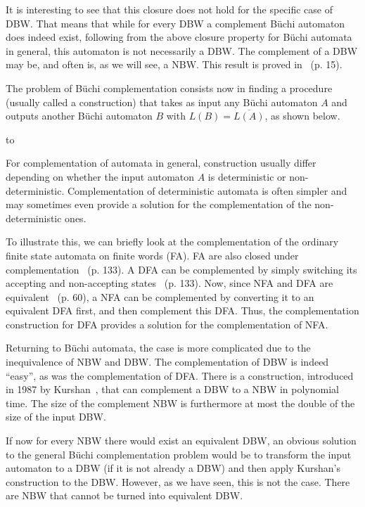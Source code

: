 It is interesting to see that this closure does not hold for the specific case of DBW. That means that while for every DBW a complement Büchi automaton does indeed exist, following from the above closure property for Büchi automata in general, this automaton is not necessarily a DBW. The complement of a DBW may be, and often is, as we will see, a NBW. This result is proved in~\cite{Thomas:1991} (p. 15).

The problem of Büchi complementation consists now in finding a procedure (usually called a construction) that takes as input any Büchi automaton $A$ and outputs another Büchi automaton $B$ with $L(B) = \overline{L(A)}$, as shown below.

\hbox to \hsize{\hfill{\Complementation}\hfill}

For complementation of automata in general, construction usually differ depending on whether the input automaton $A$ is deterministic or non-deterministic. Complementation of deterministic automata is often simpler and may sometimes even provide a solution for the complementation of the non-deterministic ones.

To illustrate this, we can briefly look at the complementation of the ordinary finite state automata on finite words (FA). FA are also closed under complementation~\cite{hopcroft2006automata} (p. 133). A DFA can be complemented by simply switching its accepting and non-accepting states~\cite{hopcroft2006automata} (p. 133). Now, since NFA and DFA are equivalent~\cite{hopcroft2006automata} (p. 60), a NFA can be complemented by converting it to an equivalent DFA first, and then complement this DFA. Thus, the complementation construction for DFA provides a solution for the complementation of NFA.

Returning to Büchi automata, the case is more complicated due to the inequivalence of NBW and DBW. The complementation of DBW is indeed ``easy'', as was the complementation of DFA. There is a construction, introduced in 1987 by Kurshan~\cite{Kurshan198759}, that can complement a DBW to a NBW in polynomial time. The size of the complement NBW is furthermore at most the double of the size of the input DBW.

If now for every NBW there would exist an equivalent DBW, an obvious solution to the general Büchi complementation problem would be to transform the input automaton to a DBW (if it is not already a DBW) and then apply Kurshan's construction to the DBW. However, as we have seen, this is not the case. There are NBW that cannot be turned into equivalent DBW.

